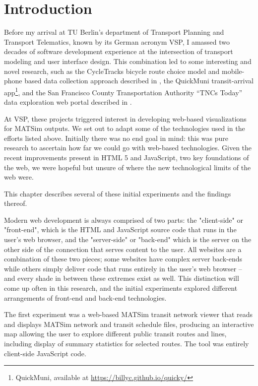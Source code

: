 \hypertarget{server-experiments-introduction}{%
\section{Introduction}\label{server-experiments-intro}}

Before my arrival at TU Berlin's department of Transport Planning and Transport Telematics, known by its German acronym \gls{VSP}, I amassed two decades of software development experience at the intersection of transport modeling and user interface design. This combination led to some interesting and novel research, such as the CycleTracks bicycle route choice model and mobile-phone based data collection approach described in \cite{HoodSallCharlton2011BicycleRouteChoiceSanFrancisco}, the QuickMuni transit-arrival app\footnote{QuickMuni, available at \url{https://billyc.github.io/quicky/}}, and the San Francisco County Transportation Authority ``TNCs Today'' data exploration web portal described in \cite{erhardt2019transportation}.

At VSP, these projects triggered interest in developing web-based visualizations for MATSim outputs. We set out to adapt some of the technologies used in the efforts listed above. Initially there was no end goal in mind: this was pure research to ascertain how far we could go with web-based technologies. Given the recent improvements present in \gls{HTML 5} and \gls{JavaScript}, two key foundations of the web, we were hopeful but unsure of where the new technological limits of the web were.

This chapter describes several of these initial experiments and the findings thereof.

Modern web development is always comprised of two parts: the "client-side" or "front-end", which is the HTML and JavaScript source code that runs in the user's web browser, and the "server-side" or "back-end" which is the server on the other side of the connection that serves content to the user. All websites are a combination of these two pieces; some websites have complex server back-ends while others simply deliver code that runs entirely in the user's web browser -- and every shade in between these extremes exist as well. This distinction will come up often in this research, and the initial experiments explored different arrangements of front-end and back-end technologies.

The first experiment was a web-based MATSim transit network viewer that reads and displays MATSim network and transit schedule files, producing an interactive map allowing the user to explore different public transit routes and lines, including display of summary statistics for selected routes. The tool was entirely client-side JavaScript code.

